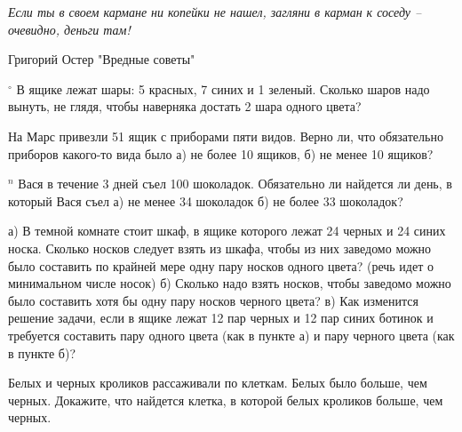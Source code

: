 \epigraph{\textit{Если ты в своем кармане ни копейки не нашел, загляни в карман к соседу – очевидно, деньги там!}}{Григорий Остер "Вредные советы"}
\begin{thm}$^\circ$
	В ящике лежат шары: 5 красных, 7 синих и 1 зеленый. Сколько шаров надо вынуть, не глядя, чтобы наверняка достать 2 шара одного цвета?
\end{thm}

\begin{thm}
	На Марс привезли 51 ящик с приборами пяти видов. Верно ли, что обязательно приборов какого-то вида было а) не более 10 ящиков, б) не менее 10 ящиков?
\end{thm}

\begin{thm}\label{2.3}
	$^n$ Вася в течение 3 дней съел 100 шоколадок. Обязательно ли найдется ли день, в который Вася съел а) не менее 34 шоколадок б) не более 33 шоколадок?
\end{thm}

%	

\begin{thm}
	а) В темной комнате стоит шкаф, в ящике которого лежат 24 черных и 24 синих носка. Сколько носков следует взять из шкафа, чтобы из них заведомо можно было составить по крайней мере одну пару носков одного цвета? (речь идет о минимальном числе носок)	
	б) Сколько надо взять носков, чтобы заведомо можно было составить хотя бы одну пару носков черного цвета?	
	в) Как изменится решение задачи, если в ящике лежат 12 пар черных и 12 пар синих ботинок и требуется составить пару одного цвета (как в пункте а) и пару черного цвета (как в пункте б)?
\end{thm}

\begin{thm}
	Белых и черных кроликов рассаживали по клеткам. Белых было больше, чем черных. Докажите, что найдется клетка, в которой белых кроликов больше, чем черных.
\end{thm}

